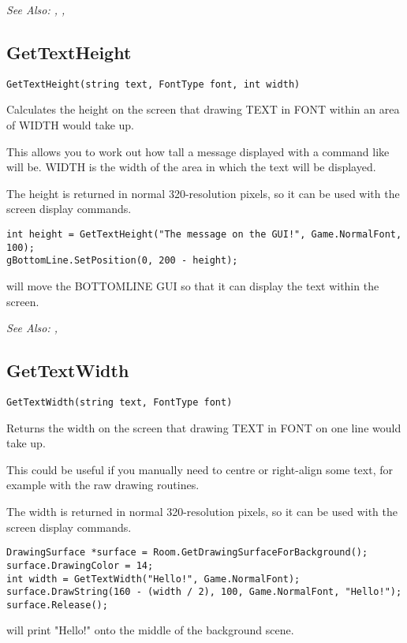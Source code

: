 \it{See Also:} ,
, 


\subsection{GetTextHeight}\label{GetTextHeight}%

\begin{verbatim}
GetTextHeight(string text, FontType font, int width)
\end{verbatim}
Calculates the height on the screen that drawing TEXT in FONT within an area of WIDTH
would take up.

This allows you to work out how tall a message displayed with a command like
 will be. WIDTH is
the width of the area in which the text will be displayed.

The height is returned in normal 320-resolution pixels, so it can be used with the
screen display commands.

\begin{verbatim}
int height = GetTextHeight("The message on the GUI!", Game.NormalFont, 100);
gBottomLine.SetPosition(0, 200 - height);
\end{verbatim}
will move the BOTTOMLINE GUI so that it can display the text within the screen.

\it{See Also:} , 



\subsection{GetTextWidth}\label{GetTextWidth}%

\begin{verbatim}
GetTextWidth(string text, FontType font)
\end{verbatim}
Returns the width on the screen that drawing TEXT in FONT on one line would take up.

This could be useful if you manually need to centre or right-align some text, for
example with the raw drawing routines.

The width is returned in normal 320-resolution pixels, so it can be used with the
screen display commands.

\begin{verbatim}
DrawingSurface *surface = Room.GetDrawingSurfaceForBackground();
surface.DrawingColor = 14;
int width = GetTextWidth("Hello!", Game.NormalFont);
surface.DrawString(160 - (width / 2), 100, Game.NormalFont, "Hello!");
surface.Release();
\end{verbatim}
will print "Hello!" onto the middle of the background scene.

